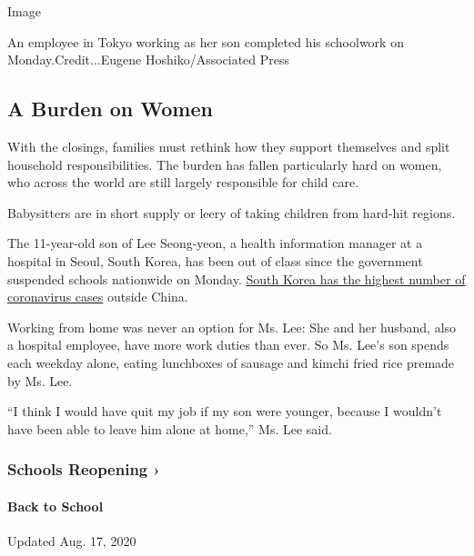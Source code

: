 Image

An employee in Tokyo working as her son completed his schoolwork on
Monday.Credit...Eugene Hoshiko/Associated Press

\hypertarget{a-burden-on-women}{%
\subsection{A Burden on Women}\label{a-burden-on-women}}

With the closings, families must rethink how they support themselves and
split household responsibilities. The burden has fallen particularly
hard on women, who across the world are still largely responsible for
child care.

Babysitters are in short supply or leery of taking children from
hard-hit regions.

The 11-year-old son of Lee Seong-yeon, a health information manager at a
hospital in Seoul, South Korea, has been out of class since the
government suspended schools nationwide on Monday.
\href{https://www.nytimes3xbfgragh.onion/2020/02/23/world/asia/south-korea-coronavirus-moon.html}{South
Korea has the highest number of coronavirus cases} outside China.

Working from home was never an option for Ms. Lee: She and her husband,
also a hospital employee, have more work duties than ever. So Ms. Lee's
son spends each weekday alone, eating lunchboxes of sausage and kimchi
fried rice premade by Ms. Lee.

``I think I would have quit my job if my son were younger, because I
wouldn't have been able to leave him alone at home,'' Ms. Lee said.

\href{https://www.nytimes3xbfgragh.onion/spotlight/schools-reopening?action=click\&pgtype=Article\&state=default\&region=MAIN_CONTENT_3\&context=storylines_keepup}{}

\hypertarget{schools-reopening-}{%
\subsubsection{Schools Reopening ›}\label{schools-reopening-}}

\hypertarget{back-to-school}{%
\paragraph{Back to School}\label{back-to-school}}

Updated Aug. 17, 2020

